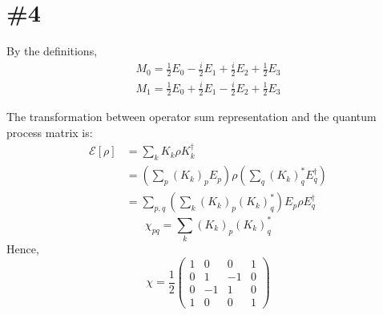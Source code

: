 \documentclass[a4paper,11pt]{article}
\begin{document}
\section{\#4}

By the definitions,
\begin{gather}
    M_0=\frac{1}{2}E_0-\frac{i}{2}E_1+\frac{i}{2}E_2+\frac{1}{2}E_3\\
    M_1=\frac{1}{2}E_0+\frac{i}{2}E_1-\frac{i}{2}E_2+\frac{1}{2}E_3
\end{gather}

The transformation between operator sum representation and the quantum process matrix is:
\begin{align}
    \mathcal E[\rho]
    &=\sum_{k}K_k\rho K_k^\dagger\\
    &=\left(\sum_{p}(K_k)_p E_{p}\right)\rho\left(\sum_{q}(K_k)_q^*E_{q}^\dagger\right)\\
    &=\sum_{p, q}\left(\sum_{k}(K_k)_p(K_k)_q^*\right)E_p\rho E_q^\dagger
\end{align}
\begin{equation}
    \chi_{pq}=\sum_{k}(K_k)_p(K_k)_q^*
\end{equation}
Hence,
\begin{equation}
    \chi=\frac{1}{2}\begin{pmatrix}
        1 &  0 &  0 & 1 \\
        0 &  1 & -1 & 0 \\
        0 & -1 &  1 & 0 \\
        1 &  0 &  0 & 1
    \end{pmatrix}
\end{equation}
\end{document}
